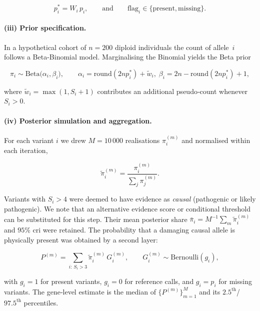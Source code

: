 \[
p_{i}^{\ast}=W_i\,p_i,
\qquad
\text{and}\qquad
\mathrm{flag}_i\in\{\text{present},\text{missing}\}.
\]

\paragraph{(iii) Prior specification.}
In a hypothetical cohort of $n=200$ diploid individuals the count of allele~$i$ follows a Beta-Binomial model.  Marginalising the Binomial yields the Beta prior

\[
\pi_i\sim\mathrm{Beta}\!\bigl(\alpha_i,\beta_i\bigr),\qquad
\alpha_i=\mathrm{round}(2np_{i}^{\ast})+\tilde w_i,\;
\beta_i = 2n-\mathrm{round}(2np_{i}^{\ast})+1,
\]

where $\tilde w_i=\max(1,S_i+1)$ contributes an additional pseudo‑count whenever $S_i>0$.

\paragraph{(iv) Posterior simulation and aggregation.}
For each variant $i$ we drew $M=10\,000$ realisations $\pi_{i}^{(m)}$ and normalised within each iteration,

\[
\tilde\pi_{i}^{(m)}=\frac{\pi_{i}^{(m)}}{\sum_{j}\pi_{j}^{(m)}}.
\]

Variants with $S_i>4$ were deemed to have evidence as \emph{causal} (pathogenic or likely pathogenic). 
We note that an alternative evidence score or conditional threshold can be substituted for this step.
Their mean posterior share $\bar\pi_i=M^{-1}\sum_m\tilde\pi_{i}^{(m)}$ and $95\%$ \ac{cri} were retained.  The probability that a damaging causal allele is physically present was obtained by a second layer:

\[
P^{(m)}=\sum_{i:\,S_i>3}\tilde\pi_{i}^{(m)}\,G_{i}^{(m)},\qquad
G_{i}^{(m)}\sim\mathrm{Bernoulli}(g_i),
\]

with $g_i=1$ for present variants, $g_i=0$ for reference calls, and $g_i=p_i$ for missing variants.  The gene‑level estimate is the median of $\{P^{(m)}\}_{m=1}^{M}$ and its $2.5^{\text{th}}$/$97.5^{\text{th}}$ percentiles.

